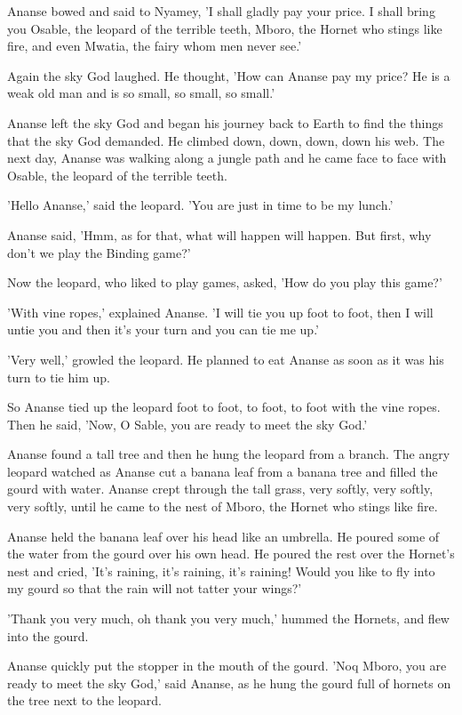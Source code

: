Ananse bowed and said to Nyamey, 'I shall gladly pay your price. I shall bring you Osable, the leopard of the terrible teeth, Mboro, the Hornet who stings like fire, and even Mwatia, the fairy whom men never see.'

Again the sky God laughed. He thought, 'How can Ananse pay my price? He is a weak old man and is so small, so small, so small.'

Ananse left the sky God and began his journey back to Earth to find the things that the sky God demanded. He climbed down, down, down, down his web. The next day, Ananse was walking along a jungle path and he came face to face with Osable, the leopard of the terrible teeth.

'Hello Ananse,' said the leopard. 'You are just in time to be my lunch.'

Ananse said, 'Hmm, as for that, what will happen will happen. But first, why don't we play the Binding game?'

Now the leopard, who liked to play games, asked, 'How do you play this game?'

'With vine ropes,' explained Ananse. 'I will tie you up foot to foot, then I will untie you and then it's your turn and you can tie me up.'

'Very well,' growled the leopard. He planned to eat Ananse as soon as it was his turn to tie him up.

So Ananse tied up the leopard foot to foot, to foot, to foot with the vine ropes. Then he said, 'Now, O Sable, you are ready to meet the sky God.'

Ananse found a tall tree and then he hung the leopard from a branch. The angry leopard watched as Ananse cut a banana leaf from a banana tree and filled the gourd with water. Ananse crept through the tall grass, very softly, very softly, very softly, until he came to the nest of Mboro, the Hornet who stings like fire.

Ananse held the banana leaf over his head like an umbrella. He poured some of the water from the gourd over his own head. He poured the rest over the Hornet's nest and cried, 'It's raining, it's raining, it's raining! Would you like to fly into my gourd so that the rain will not tatter your wings?'

'Thank you very much, oh thank you very much,' hummed the Hornets, and flew into the gourd.

Ananse quickly put the stopper in the mouth of the gourd. 'Noq Mboro, you are ready to meet the sky God,' said Ananse, as he hung the gourd full of hornets on the tree next to the leopard.

